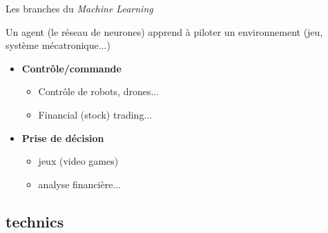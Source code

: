 \documentclass[10pt,serif,mathserif,compress,hyperref={colorlinks}]{beamer}
\begin{document}
\begin{frame}{Les branches du {\em Machine Learning}}
  \begin{tcolorbox}[title={\em Reinforcement learning}\\Apprentissage par renforcement]
    Un agent (le réseau de neurones) apprend à piloter un environnement (jeu, système mécatronique...)
    \begin{itemize}
    \item \textbf{Contrôle/commande}
      \begin{itemize}
      \item Contrôle de robots, drones...
      \item Financial (stock) trading...
      \end{itemize}        
    \item \textbf{Prise de décision}
      \begin{itemize}
      \item jeux (video games)
      \item analyse financière...
      \end{itemize}
    \end{itemize}
  \end{tcolorbox}    
\end{frame}

\subsection{technics}
\end{document}
